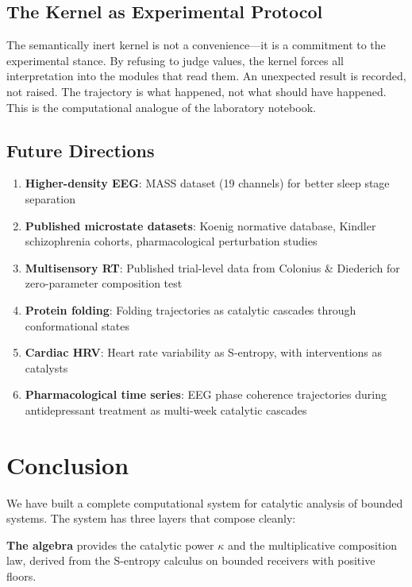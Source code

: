 \documentclass[11pt,a4paper]{article}
\theoremstyle{definition}
\theoremstyle{remark}
\begin{document}
\subsection{The Kernel as Experimental Protocol}

The semantically inert kernel is not a convenience---it is a commitment to the experimental stance. By refusing to judge values, the kernel forces all interpretation into the modules that read them. An unexpected result is recorded, not raised. The trajectory is what happened, not what should have happened. This is the computational analogue of the laboratory notebook.

\subsection{Future Directions}

\begin{enumerate}[nosep]
\item \textbf{Higher-density EEG}: MASS dataset (19 channels) for better sleep stage separation
\item \textbf{Published microstate datasets}: Koenig normative database, Kindler schizophrenia cohorts, pharmacological perturbation studies
\item \textbf{Multisensory RT}: Published trial-level data from Colonius \& Diederich for zero-parameter composition test
\item \textbf{Protein folding}: Folding trajectories as catalytic cascades through conformational states
\item \textbf{Cardiac HRV}: Heart rate variability as S-entropy, with interventions as catalysts
\item \textbf{Pharmacological time series}: EEG phase coherence trajectories during antidepressant treatment as multi-week catalytic cascades
\end{enumerate}

\section{Conclusion}
\label{sec:conclusion}

We have built a complete computational system for catalytic analysis of bounded systems. The system has three layers that compose cleanly:

\textbf{The algebra} provides the catalytic power $\kappa$ and the multiplicative composition law, derived from the S-entropy calculus on bounded receivers with positive floors.
\end{document}
